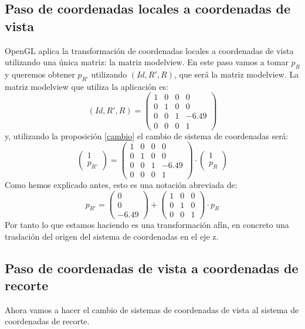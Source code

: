 \documentclass[a4paper,11pt, oneside]{book}
\begin{document}
\subsection{Paso de coordenadas locales a coordenadas de vista}

OpenGL aplica la transformación de coordenadas locales a coordenadas de vista utilizando una única matriz: la matriz modelview. En este paso vamos a tomar $p_R$ y queremos obtener $p_{R'}$ utilizando $(Id, R', R)$, que será la matriz modelview.
La matriz modelview que utiliza la aplicación es:
$$(Id, R', R) = \begin{pmatrix}
	1 & 0 & 0& 0 \\
	0 & 1&0&0 \\
	0&0&1&-6.49 \\
	0&0&0&1
\end{pmatrix}$$
y, utilizando la proposición \ref{cambio} el cambio de sistema de coordenadas será:
$$\begin{pmatrix}
	1 \\
	p_{R'}
\end{pmatrix} = \begin{pmatrix}
	1 & 0 & 0& 0 \\
	0 & 1&0&0 \\
	0&0&1&-6.49 \\
	0&0&0&1
\end{pmatrix}\cdot \begin{pmatrix}
1 \\
p_{R}
\end{pmatrix}$$
Como hemos explicado antes, esto es una notación abreviada de:
\begin{equation}
p_{R'} = 
\begin{pmatrix}
0\\
0\\
-6.49
\end{pmatrix}
+
\begin{pmatrix}
1&0&0 \\
0&1&0\\
0&0&1
\end{pmatrix}
\cdot p_R
\end{equation}
Por tanto lo que estamos haciendo es una transformación afín, en concreto una traslación del origen del sistema de coordenadas en el eje z.

\subsection{Paso de coordenadas de vista a coordenadas de recorte}
Ahora vamos a hacer el cambio de sistemas de coordenadas de vista al sistema de coordenadas de recorte.
\end{document}
